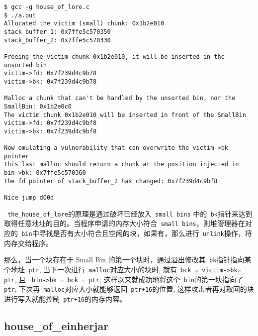 \begin{verbatim}
$ gcc -g house_of_lore.c 
$ ./a.out 
Allocated the victim (small) chunk: 0x1b2e010
stack_buffer_1: 0x7ffe5c570350
stack_buffer_2: 0x7ffe5c570330

Freeing the victim chunk 0x1b2e010, it will be inserted in the unsorted bin
victim->fd: 0x7f239d4c9b78
victim->bk: 0x7f239d4c9b78

Malloc a chunk that can't be handled by the unsorted bin, nor the SmallBin: 0x1b2e0c0
The victim chunk 0x1b2e010 will be inserted in front of the SmallBin
victim->fd: 0x7f239d4c9bf8
victim->bk: 0x7f239d4c9bf8

Now emulating a vulnerability that can overwrite the victim->bk pointer
This last malloc should return a chunk at the position injected in bin->bk: 0x7ffe5c570360
The fd pointer of stack_buffer_2 has changed: 0x7f239d4c9bf8

Nice jump d00d
\end{verbatim}

\verb+ the_house_of_lore+的原理是通过破坏已经放入\verb+ small bins+ 中的\verb+ bk+指针来达到取得任意地址的目的。当程序申请的内存大小符合\verb+ small bins+，则堆管理器在对应的\verb+ bin+中寻找是否有大小符合且空闲的块，如果有，那么进行\verb+ unlink+操作，将内存交给程序。

那么，当一个块存在于 Small Bin 的第一个块时，通过溢出修改其\verb+ bk+指针指向某个地址\verb+ ptr+, 当下一次进行\verb+ malloc+对应大小的块时, 就有\verb+ bck = victim->bk= ptr+, 且 \verb+ bin->bk = bck = ptr+, 这样以来就成功地将这个\verb+ bin+的第一块指向了\verb+ ptr+, 下次再\verb+ malloc+对应大小就能够返回\verb| ptr+16|的位置, 这样攻击者再对取回的块进行写入就能控制\verb$ ptr+16$的内存内容。

\subsection{house\_of\_einherjar}


